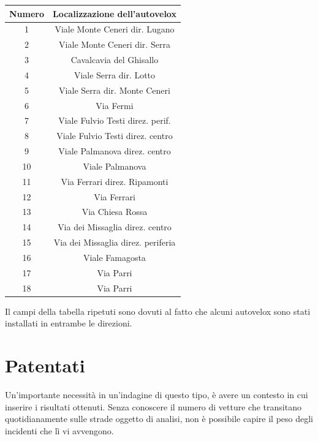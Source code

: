 \documentclass[a4paper,12pt]{report}
\begin{document}
\begin{center}
    \def\arraystretch{1.5}%
    \begin{tabular}{ |c|c| } 
    \hline
    Numero & Localizzazione dell'autovelox \\ 
    \hline
    \rowcolor{TableGray}
    1   &   Viale Monte Ceneri  dir. Lugano\\
    2   &   Viale Monte Ceneri dir. Serra\\
    \rowcolor{TableGray}
    3   &   Cavalcavia del Ghisallo\\
    4   &   Viale Serra dir. Lotto\\
    \rowcolor{TableGray}
    5   &   Viale Serra dir. Monte Ceneri\\
    6   &   Via Fermi\\
    \rowcolor{TableGray}
    7   &   Viale Fulvio Testi direz. perif.\\
    8   &   Viale Fulvio Testi direz. centro\\
    \rowcolor{TableGray}
    9   &   Viale Palmanova  direz. centro\\
    10  &   Viale Palmanova\\
    \rowcolor{TableGray}
    11  &   Via Ferrari direz. Ripamonti\\
    12  &   Via Ferrari\\
    \rowcolor{TableGray}
    13  &   Via Chiesa Rossa\\
    14  &   Via dei Missaglia direz. centro\\
    \rowcolor{TableGray}
    15  &   Via dei Missaglia direz. periferia\\
    16  &   Viale Famagosta\\
    \rowcolor{TableGray}
    17  &   Via Parri\\
    18  &   Via Parri\\
    \hline
    \end{tabular}
    \label{ztl-milano}
\end{center}

Il campi della tabella ripetuti sono dovuti al fatto che alcuni autovelox sono stati 
installati in entrambe le direzioni. 

\section{Patentati}

Un'importante necessità in un'indagine di questo tipo, è avere un contesto in cui inserire 
i risultati ottenuti. 
Senza conoscere il numero di vetture che transitano quotidianamente sulle strade oggetto 
di analisi, non è possibile capire il peso degli incidenti che lì vi avvengono.
\end{document}
